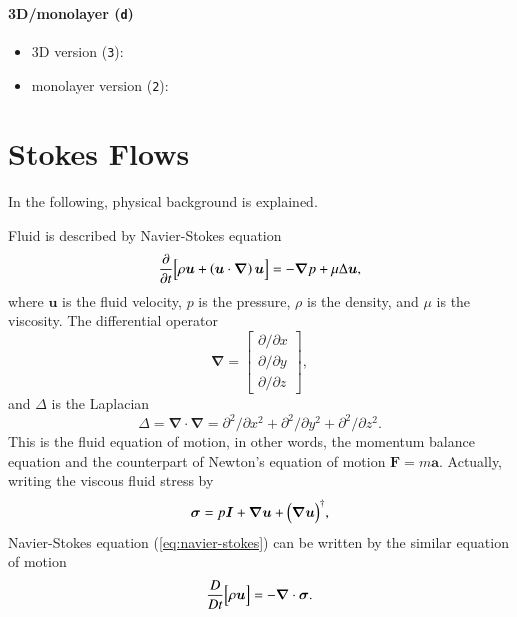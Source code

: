 \documentclass{book}
\begin{document}
\paragraph{3D/monolayer ({\tt d})}
\begin{itemize}
\item 3D version ({\tt 3}):
\item monolayer version ({\tt 2}):
\end{itemize}


\section{Stokes Flows}
In the following, physical background is explained.

Fluid is described by Navier-Stokes equation
\begin{equation}
  \frac{\partial}{\partial t}
  \Bigl[
    \rho
    \bm{u}
    +
    \left(
      \bm{u}
      \cdot
      \bm{\nabla}
    \right)
    \bm{u}
  \Bigr]
  =
  -
  \bm{\nabla}
  p
  +
  \mu
  \Delta
  \bm{u}
  ,
  \label{eq:navier-stokes}
\end{equation}
where $\bm{u}$ is the fluid velocity,
$p$ is the pressure, $\rho$ is the density,
and $\mu$ is the viscosity.
The differential operator
\begin{equation}
  \bm{\nabla}
  =
  \left[
    \begin{array}{c}
      \partial/\partial x\\
      \partial/\partial y\\
      \partial/\partial z
    \end{array}
  \right]
  ,
\end{equation}
and $\Delta$ is the Laplacian
\begin{equation}
  \Delta
  =
  \bm{\nabla}
  \cdot
  \bm{\nabla}
  =
  \partial^2/\partial x^2
  +
  \partial^2/\partial y^2
  +
  \partial^2/\partial z^2
  .
\end{equation}
This is the fluid equation of motion, in other words,
the momentum balance equation and the counterpart of
Newton's equation of motion $\bm{F} = m\bm{a}$.
Actually, writing the viscous fluid stress by
\begin{equation}
  \bm{\sigma}
  =
  p
  \bm{I}
  +
  \bm{\nabla}\bm{u}
  +
  \Bigl(
  \bm{\nabla}\bm{u}
  \Bigr)^\dagger
  ,
\end{equation}
Navier-Stokes equation (\ref{eq:navier-stokes}) can be written by
the similar equation of motion
\begin{equation}
  \frac{D}{D t}
  \Bigl[
    \rho
    \bm{u}
  \Bigr]
  =
  -
  \bm{\nabla}
  \cdot
  \bm{\sigma}
  .
\end{equation}
\end{document}
